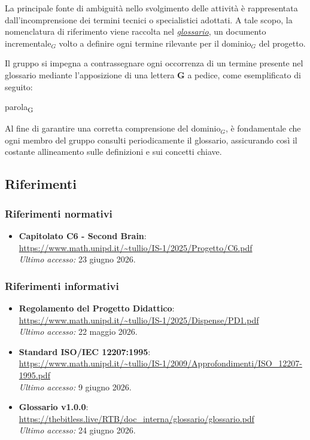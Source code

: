 \documentclass[a4paper, 10pt]{article}
\begin{document}
La principale fonte di ambiguità nello svolgimento delle attività è rappresentata dall'incomprensione dei termini tecnici o specialistici adottati. A tale scopo, la nomenclatura di riferimento viene raccolta nel \href{https://thebitless.live/RTB/doc_interna/glossario/glossario.pdf}{\textit{glossario}}, un documento incrementale$_G$ volto a definire ogni termine rilevante per il dominio$_G$ del progetto.

Il gruppo si impegna a contrassegnare ogni occorrenza di un termine presente nel glossario mediante l'apposizione di una lettera \textbf{G} a pedice, come esemplificato di seguito:

\noindent parola\textsubscript{G}

Al fine di garantire una corretta comprensione del dominio$_G$, è fondamentale che ogni membro del gruppo consulti periodicamente il glossario, assicurando così il costante allineamento sulle definizioni e sui concetti chiave.

\subsection{Riferimenti}

\subsubsection{Riferimenti normativi}
\begin{itemize}
    \item \textbf{Capitolato C6 - Second Brain}: \\
    \url{https://www.math.unipd.it/~tullio/IS-1/2025/Progetto/C6.pdf} \\
    \textit{Ultimo accesso:} 23 giugno 2026.
\end{itemize}

\subsubsection{Riferimenti informativi}
\begin{itemize}
    \item \textbf{Regolamento del Progetto Didattico}: \\
    \url{https://www.math.unipd.it/~tullio/IS-1/2025/Dispense/PD1.pdf} \\
    \textit{Ultimo accesso:} 22 maggio 2026.
    
    \item \textbf{Standard ISO/IEC 12207:1995}: \\
    \url{https://www.math.unipd.it/~tullio/IS-1/2009/Approfondimenti/ISO_12207-1995.pdf} \\
    \textit{Ultimo accesso:} 9 giugno 2026. \\
    
    \item \textbf{Glossario v1.0.0}: \\
    \url{https://thebitless.live/RTB/doc_interna/glossario/glossario.pdf} \\
    \textit{Ultimo accesso:} 24 giugno 2026. \\
\end{itemize}
\end{document}
